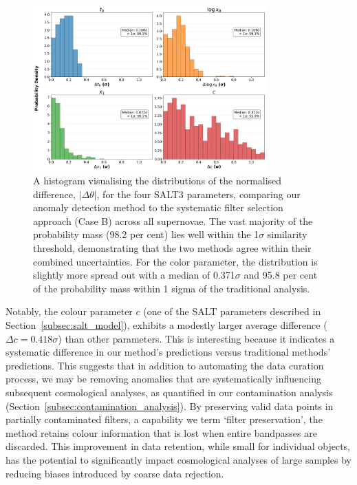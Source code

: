 \begin{figure}
\centering
\includegraphics[width=0.8\textwidth]{images/normalized_difference_bars_Ia_all.png}
\caption{A histogram visualising the distributions of the normalised difference, $|\Delta\theta|$, for the four SALT3 parameters, comparing our anomaly detection method to the systematic filter selection approach (Case B) across all supernovae. The vast majority of the probability mass (98.2 per cent) lies well within the 1$\sigma$ similarity threshold, demonstrating that the two methods agree within their combined uncertainties. For the color parameter, the distribution is slightly more spread out with a median of 0.371$\sigma$ and 95.8 per cent of the probability mass within 1 sigma of the traditional analysis.}
\label{fig:similarity_corner}
\end{figure}

Notably, the colour parameter $c$ (one of the SALT parameters described in Section~\ref{subsec:salt_model}), exhibits a modestly larger average difference ($\Delta c = 0.418\sigma$) than other parameters. This is interesting because it indicates a systematic difference in our method's predictions versus traditional methods' predictions. This suggests that in addition to automating the data curation process, we may be removing anomalies that are systematically influencing subsequent cosmological analyses, as quantified in our contamination analysis (Section~\ref{subsec:contamination_analysis}). By preserving valid data points in partially contaminated filters, a capability we term `filter preservation', the method retains colour information that is lost when entire bandpasses are discarded. This improvement in data retention, while small for individual objects, has the potential to significantly impact cosmological analyses of large samples by reducing biases introduced by coarse data rejection.


